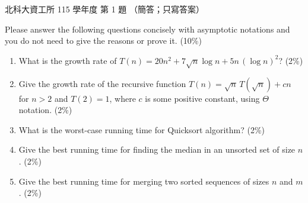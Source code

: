 \begin{pastexam}[label={px:ntut-115-ci-01}]{北科大資工所 115 學年度 第 1 題}
（簡答；只寫答案）

Please answer the following questions concisely with asymptotic notations and you do not need to
give the reasons or prove it. (10\%)
\begin{enumerate}[label=(\arabic*)]
\item What is the growth rate of $T(n) = 20n^2 + 7\sqrt{n}\log n + 5n\,(\log n)^2$? (2\%)
\item Give the growth rate of the recursive function $T(n) = \sqrt{n}\,T(\sqrt{n}) + cn$ for
$n > 2$ and $T(2) = 1$, where $c$ is some positive constant, using $\Theta$ notation. (2\%)
\item What is the worst-case running time for Quicksort algorithm? (2\%)
\item Give the best running time for finding the median in an unsorted set of size $n$. (2\%)
\item Give the best running time for merging two sorted sequences of sizes $n$ and $m$. (2\%)
\end{enumerate}
\end{pastexam}

